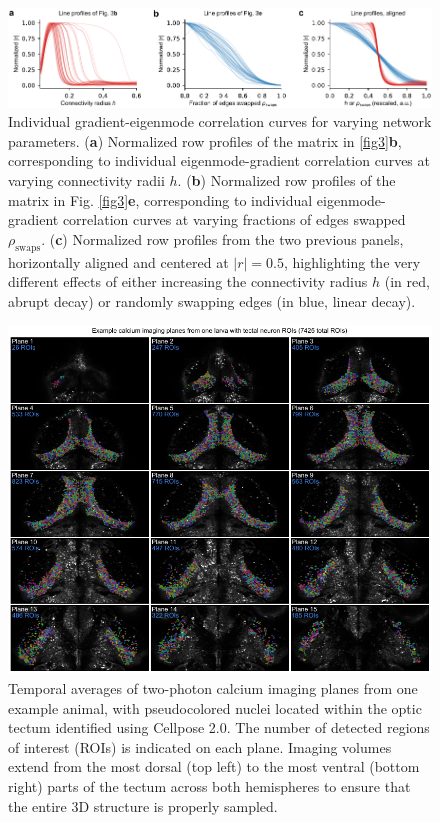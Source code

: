 \documentclass{article}
\begin{document}
\newpage

\begin{figure}[t]
    \centering
    \includegraphics[width=1.0\linewidth]{figures/supp_lineprofiles.pdf}
    \caption{Individual gradient-eigenmode correlation curves for varying network parameters. (\textbf{a}) Normalized row profiles of the matrix in \ref{fig3}\textbf{b}, corresponding to individual eigenmode-gradient correlation curves at varying connectivity radii $h$. (\textbf{b}) Normalized row profiles of the matrix in Fig. \ref{fig3}\textbf{e}, corresponding to individual eigenmode-gradient correlation curves at varying fractions of edges swapped $\rho_{\text{swaps}}$. (\textbf{c}) Normalized row profiles from the two previous panels, horizontally aligned and centered at $|r|=0.5$, highlighting the very different effects of either increasing the connectivity radius $h$ (in red, abrupt decay) or randomly swapping edges (in blue, linear decay).}
    \label{supp_lineprofiles}
\end{figure}

\newpage

\begin{figure}[t]
    \centering
    \includegraphics[width=1.0\linewidth]{figures/supp_imagingplanes.pdf}
    \caption{Temporal averages of two-photon calcium imaging planes from one example animal, with pseudocolored nuclei located within the optic tectum identified using Cellpose 2.0. The number of detected regions of interest (ROIs) is indicated on each plane. Imaging volumes extend from the most dorsal (top left) to the most ventral (bottom right) parts of the tectum across both hemispheres to ensure that the entire 3D structure is properly sampled.}
    \label{supp_imagingplanes}
\end{figure}
\end{document}

